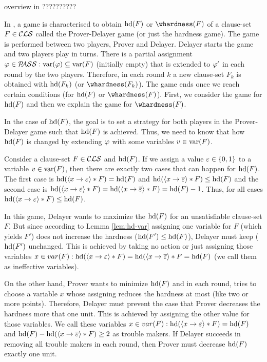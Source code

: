 \documentclass{report}
\begin{document}
overview in \cite{h18, h30,h31,?????}??????????

In \cite{h18}, a game is characterised to obtain $\operatorname{hd}(F)$ or $\whardness(F)$ of a clause-set $F \in \mathcal{CLS}$ called the Prover-Delayer game (or just the hardness game). The game is performed between two players, Prover and Delayer. Delayer starts the game and two players play in turns. There is a partial assignment $\varphi \in \mathcal{P\hspace{-0.32em}ASS}: \operatorname{var}(\varphi) \subseteq \operatorname{var}(F)$ (initially empty) that is extended to $\varphi'$ in each round by the two players. Therefore, in each round $k$ a new clause-set $F_k$ is obtained with $\operatorname{hd}(F_k)$ (or $\whardness(F_k)$). The game ends once we reach certain conditions (for $\operatorname{hd}(F)$ or $\whardness(F)$). First, we consider the game for $\operatorname{hd}(F)$ and then we explain the game for $\whardness(F)$.

In the case of $\operatorname{hd}(F)$, the goal is to set a strategy for both players in the Prover-Delayer game such that $\operatorname{hd}(F)$ is achieved. Thus, we need to know that how $\operatorname{hd}(F)$ is changed by extending $\varphi$ with some variables $v \in \operatorname{var}(F)$. 

\begin{lem}\label{lem:hd-var}
\cite{h18} Consider a clause-set $F \in \mathcal{CLS}$ and $\operatorname{hd}(F)$. If we assign a value $\varepsilon \in \{ 0,1 \}$ to a variable $v \in \operatorname{var}(F)$, then there are exactly two cases that can happen for $\operatorname{hd}(F)$. The first case is $\operatorname{hd}(\langle x \rightarrow \varepsilon \rangle*F)=\operatorname{hd}(F)$ and $\operatorname{hd}(\langle x \rightarrow \overline {\varepsilon} \rangle*F) \leq \operatorname{hd}(F)$ and the second case is  $\operatorname{hd}(\langle x \rightarrow \varepsilon \rangle*F)=\operatorname{hd}(\langle x \rightarrow \overline {\varepsilon} \rangle*F)=\operatorname{hd}(F)-1$. Thus, for all cases  $\operatorname{hd}(\langle x \rightarrow \varepsilon \rangle*F) \leq \operatorname{hd}(F)$.
\end{lem}

In this game, Delayer wants to maximize the $\operatorname{hd}(F)$ for an unsatisfiable clause-set $F$. But since according to Lemma \ref{lem:hd-var} assigning one variable for $F$ (which yields $F'$) does not increase the hardness ($\operatorname{hd}(F') \leq \operatorname{hd}(F)$), Delayer must keep ($\operatorname{hd}(F')$ unchanged. This is achieved by taking no action or just assigning those variables $x \in var(F): \operatorname{hd}(\langle x \rightarrow \varepsilon \rangle*F)=\operatorname{hd}(\langle x \rightarrow \overline {\varepsilon} \rangle*F = \operatorname{hd}(F)$ (we call them as ineffective variables). 

On the other hand, Prover wants to minimize  $\operatorname{hd}(F)$ and in each round, tries to choose a variable $x$ whose assigning reduces the hardness at most (like two or more points). Therefore, Delayer must prevent the case that Prover decreases the hardness more that one unit. This is achieved by assigning the other value for those variables. We call these variables $x \in var(F): \operatorname{hd}(\langle x \rightarrow \varepsilon \rangle*F)=\operatorname{hd}(F)$ and $\operatorname{hd}(F)- \operatorname{hd}(\langle x \rightarrow \overline {\varepsilon} \rangle*F) \geq 2$ as trouble makers. If Delayer succeeds in removing all trouble makers in each round, then Prover must decrease $\operatorname{hd}(F)$ exactly one unit.
  
\end{document}
